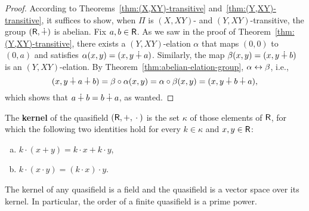 \begin{proof}
    According to Theorems~\ref{thm:(X,XY)-transitive} and~\ref{thm:(Y,XY)-transitive}, it suffices to show, when $\Pi$ is $(X,XY)$- and $(Y,XY)$-transitive, the group $(\mathsf R,\dotplus)$ is abelian. Fix $a,b\in\mathsf R$. As we saw in the proof of Theorem~\ref{thm:(Y,XY)-transitive}, there exists a $(Y,XY)$-elation $\alpha$ that maps $(0,0)$ to $(0,a)$ and satisfies $\alpha(x,y)=(x,y\dotplus a)$. Similarly, the map $\beta(x,y)=(x,y\dotplus b)$ is an $(Y,XY)$-elation. By Theorem~\ref{thm:abelian-elation-group}, $\alpha\mathrel\leftrightarrow\beta$, i.e.,
    \[
        (x,y\dotplus a\dotplus b)=\beta\circ\alpha(x,y)=\alpha\circ\beta(x,y)
            = (x,y\dotplus b\dotplus a),
    \]
    which shows that $a\dotplus b=b\dotplus a$, as wanted.
\end{proof}

\begin{defn}
    The \textbf{kernel} of the quasifield\/ $(\mathsf R,+,{}\cdot{})$ is the set\/ $\kappa$ of those elements of\/ $\mathsf R$, for which the following two identities hold for every\/ $k\in\kappa$ and\/ $x, y \in \mathsf R$:
    \begin{enumerate}[a), font=\upshape]
        \item $k\cdot(x+y) = k\cdot x + k\cdot y$,
        \item $k\cdot(x\cdot y) = (k\cdot x)\cdot y$.
    \end{enumerate}
\end{defn}

\begin{thm}
    The kernel of any quasifield is a field and the quasifield is a vector space over its kernel. In particular, the order of a finite quasifield is a prime power.
\end{thm}

